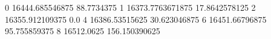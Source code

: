 0 16444.685546875 88.7734375
1 16373.7763671875 17.8642578125
2 16355.912109375 0.0
4 16386.53515625 30.623046875
6 16451.66796875 95.755859375
8 16512.0625 156.150390625
